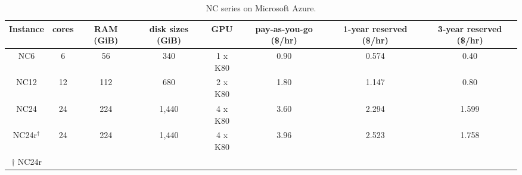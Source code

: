 \begin{table*}
\caption{\label{tab:table}NC series on Microsoft Azure.}
\begin{center}
\begin{tabular}{cccccccc}
Instance & cores & RAM (GiB) & disk sizes (GiB) & GPU & pay-as-you-go (\$/hr) & 1-year reserved (\$/hr) & 3-year reserved (\$/hr) \\
\hline
NC6 & 6 & 56 & 340 & 1 x K80 & 0.90 & 0.574 & 0.40 \\
NC12 & 12 & 112 & 680 & 2 x K80 & 1.80 & 1.147 & 0.80 \\
NC24 & 24 & 224 & 1,440 & 4 x K80 & 3.60 & 2.294 & 1.599 \\
NC24r$^\dagger$ & 24 & 224 & 1,440 & 4 x K80 & 3.96 & 2.523 & 1.758 \\
\hline
$\dagger$ NC24r
\end{tabular}
\end{center}
\end{table*}
